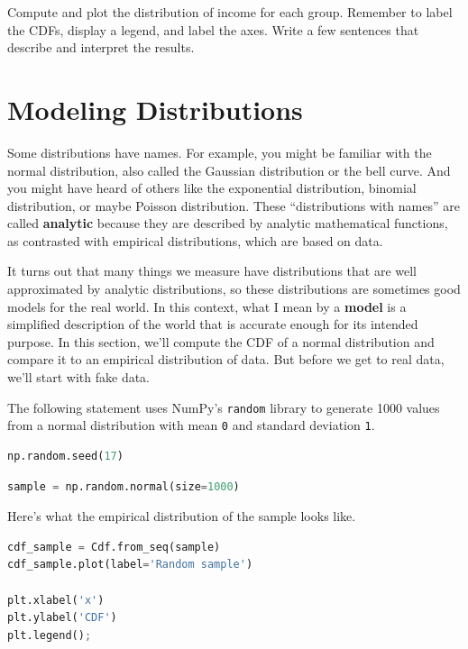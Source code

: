 Compute and plot the distribution of income for each group. Remember to
label the CDFs, display a legend, and label the axes. Write a few
sentences that describe and interpret the results.

\hypertarget{modeling-distributions}{%
\section{Modeling Distributions}\label{modeling-distributions}}

Some distributions have names. For example, you might be familiar with
the normal distribution, also called the Gaussian distribution or the
bell curve. And you might have heard of others like the exponential
distribution, binomial distribution, or maybe Poisson distribution.
These ``distributions with names'' are called \textbf{analytic} because
they are described by analytic mathematical functions, as contrasted
with empirical distributions, which are based on data.

It turns out that many things we measure have distributions that are
well approximated by analytic distributions, so these distributions are
sometimes good models for the real world. In this context, what I mean
by a \textbf{model} is a simplified description of the world that is
accurate enough for its intended purpose. In this section, we'll compute
the CDF of a normal distribution and compare it to an empirical
distribution of data. But before we get to real data, we'll start with
fake data.

The following statement uses NumPy's \passthrough{\lstinline!random!}
library to generate 1000 values from a normal distribution with mean
\passthrough{\lstinline!0!} and standard deviation
\passthrough{\lstinline!1!}.

\begin{lstlisting}[language=Python,style=source]
np.random.seed(17)
\end{lstlisting}

\begin{lstlisting}[language=Python,style=source]
sample = np.random.normal(size=1000)
\end{lstlisting}

Here's what the empirical distribution of the sample looks like.

\begin{lstlisting}[language=Python,style=source]
cdf_sample = Cdf.from_seq(sample)
cdf_sample.plot(label='Random sample')

plt.xlabel('x')
plt.ylabel('CDF')
plt.legend();
\end{lstlisting}


